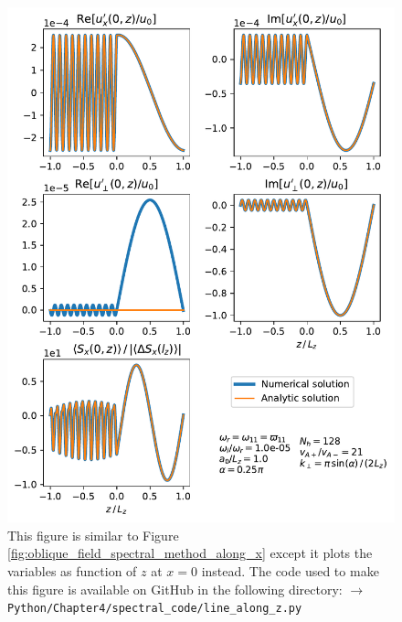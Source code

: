 \begin{figure}
    \centering
    \vspace{-20pt}
    \includegraphics[width=\textwidth,height=0.9\textheight,keepaspectratio]{figures/chapter04/oblique_field_spectral_method_along_z.pdf}
    \vspace{-10pt}
    \caption{This figure is similar to Figure \ref{fig:oblique_field_spectral_method_along_x} except it plots the variables as function of $z$ at $x=0$ instead. The code used to make this figure is available on GitHub in the following directory:\newline
    \texttt{$\rightarrow$ Python/Chapter4/spectral\_code/line\_along\_z.py}}
    \label{fig:oblique_field_spectral_method_along_z}
    \vspace{-20pt}
\end{figure}

